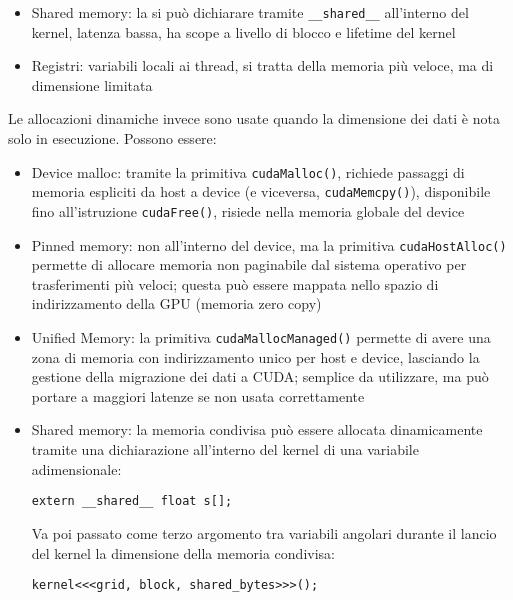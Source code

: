 \begin{questions}
\begin{solution}
\begin{itemize}
            \item Shared memory: la si può dichiarare tramite \texttt{\_\_shared\_\_} all'interno del kernel, latenza bassa, ha scope a livello di blocco e lifetime del kernel
            
            \item Registri: variabili locali ai thread, si tratta della memoria più veloce, ma di dimensione limitata
        \end{itemize}
        
        Le allocazioni dinamiche invece sono usate quando la dimensione dei dati è nota solo in esecuzione. Possono essere:
        \begin{itemize}
            \item Device malloc: tramite la primitiva \texttt{cudaMalloc()}, richiede passaggi di memoria espliciti da host a device (e viceversa, \texttt{cudaMemcpy()}), disponibile fino all'istruzione \texttt{cudaFree()}, risiede nella memoria globale del device
            
            \item Pinned memory: non all'interno del device, ma la primitiva \texttt{cudaHostAlloc()} permette di allocare memoria non paginabile dal sistema operativo per trasferimenti più veloci; questa può essere mappata nello spazio di indirizzamento della GPU (memoria zero copy)
            
            \item Unified Memory: la primitiva \texttt{cudaMallocManaged()} permette di avere una zona di memoria con indirizzamento unico per host e device, lasciando la gestione della migrazione dei dati a CUDA; semplice da utilizzare, ma può portare a maggiori latenze se non usata correttamente
            
            \item Shared memory: la memoria condivisa può essere allocata dinamicamente tramite una dichiarazione all'interno del kernel di una variabile adimensionale:
            \begin{verbatim}
extern __shared__ float s[];
            \end{verbatim}
            Va poi passato come terzo argomento tra variabili angolari durante il lancio del kernel la dimensione della memoria condivisa:
            \begin{verbatim}
kernel<<<grid, block, shared_bytes>>>();
            \end{verbatim}
        \end{itemize}
    \end{solution}
    

\end{questions}
